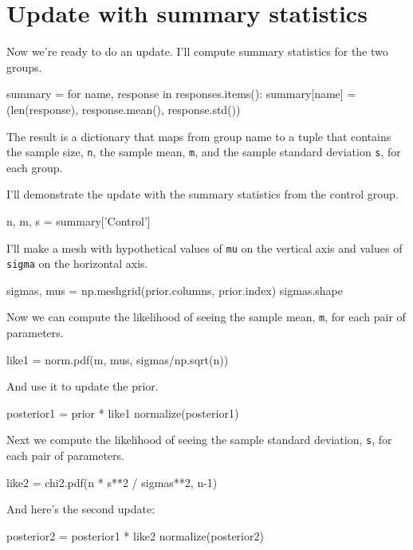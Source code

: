\documentclass[12pt]{book}
\theoremstyle{exercise}
\newcommand{\py}[1]{{\tt #1}}%
\begin{document}
\section{Update with summary statistics}

Now we're ready to do an update. I'll compute summary statistics for the
two groups.

\begin{code}
summary = {}
for name, response in responses.items():
    summary[name] = (len(response),
                     response.mean(),
                     response.std())
\end{code}

The result is a dictionary that maps from group name to a tuple that
contains the sample size, \py{n}, the sample mean,
\py{m}, and the sample standard deviation
\py{s}, for each group.

I'll demonstrate the update with the summary statistics from the control
group.

\begin{code}
n, m, s = summary['Control']
\end{code}

I'll make a mesh with hypothetical values of
\py{mu} on the vertical axis and values of
\py{sigma} on the horizontal axis.

\begin{code}
sigmas, mus = np.meshgrid(prior.columns, prior.index)
sigmas.shape
\end{code}

Now we can compute the likelihood of seeing the sample mean,
\py{m}, for each pair of parameters.

\begin{code}
like1 = norm.pdf(m, mus, sigmas/np.sqrt(n))
\end{code}

And use it to update the prior.

\begin{code}
posterior1 = prior * like1
normalize(posterior1)
\end{code}

Next we compute the likelihood of seeing the sample standard deviation, \py{s}, for each pair of parameters.

\begin{code}
like2 = chi2.pdf(n * s**2 / sigmas**2, n-1)
\end{code}

And here's the second update:

\begin{code}
posterior2 = posterior1 * like2
normalize(posterior2)
\end{code}
\end{document}
